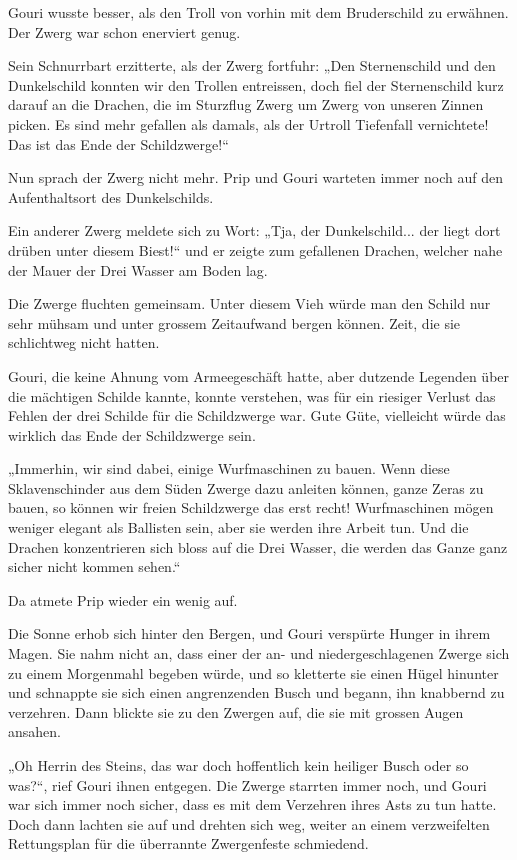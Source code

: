 Gouri wusste besser, als den Troll von vorhin mit dem Bruderschild zu erwähnen. Der Zwerg war schon enerviert genug.

Sein Schnurrbart erzitterte, als der Zwerg fortfuhr: „Den Sternenschild und den Dunkelschild konnten wir den Trollen entreissen, doch fiel der Sternenschild kurz darauf an die Drachen, die im Sturzflug Zwerg um Zwerg von unseren Zinnen picken. Es sind mehr gefallen als damals, als der Urtroll Tiefenfall vernichtete! Das ist das Ende der Schildzwerge!“

Nun sprach der Zwerg nicht mehr. Prip und Gouri warteten immer noch auf den Aufenthaltsort des Dunkelschilds.

Ein anderer Zwerg meldete sich zu Wort: „Tja, der Dunkelschild... der liegt dort drüben unter diesem Biest!“ und er zeigte zum gefallenen Drachen, welcher nahe der Mauer der Drei Wasser am Boden lag.

Die Zwerge fluchten gemeinsam. Unter diesem Vieh würde man den Schild nur sehr mühsam und unter grossem Zeitaufwand bergen können. Zeit, die sie schlichtweg nicht hatten.

Gouri, die keine Ahnung vom Armeegeschäft hatte, aber dutzende Legenden über die mächtigen Schilde kannte, konnte verstehen, was für ein riesiger Verlust das Fehlen der drei Schilde für die Schildzwerge war. Gute Güte, vielleicht würde das wirklich das Ende der Schildzwerge sein.

„Immerhin, wir sind dabei, einige Wurfmaschinen zu bauen. Wenn diese Sklavenschinder aus dem Süden Zwerge dazu anleiten können, ganze Zeras zu bauen, so können wir freien Schildzwerge das erst recht! Wurfmaschinen mögen weniger elegant als Ballisten sein, aber sie werden ihre Arbeit tun. Und die Drachen konzentrieren sich bloss auf die Drei Wasser, die werden das Ganze ganz sicher nicht kommen sehen.“

Da atmete Prip wieder ein wenig auf.



\trennzeichen



Die Sonne erhob sich hinter den Bergen, und Gouri verspürte Hunger in ihrem Magen. Sie nahm nicht an, dass einer der an- und niedergeschlagenen Zwerge sich zu einem Morgenmahl begeben würde, und so kletterte sie einen Hügel hinunter und schnappte sie sich einen angrenzenden Busch und begann, ihn knabbernd zu verzehren. Dann blickte sie zu den Zwergen auf, die sie mit grossen Augen ansahen.

„Oh Herrin des Steins, das war doch hoffentlich kein heiliger Busch oder so was?“, rief Gouri ihnen entgegen. Die Zwerge starrten immer noch, und Gouri war sich immer noch sicher, dass es mit dem Verzehren ihres Asts zu tun hatte. Doch dann lachten sie auf und drehten sich weg, weiter an einem verzweifelten Rettungsplan für die überrannte Zwergenfeste schmiedend.

